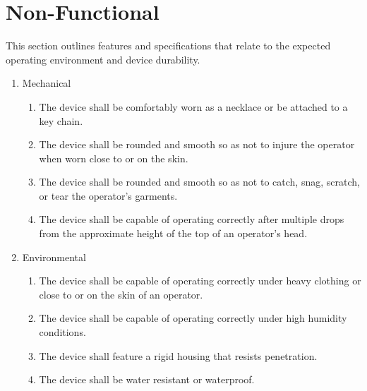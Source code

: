 \documentclass[twoside]{article}
\begin{document}
\section{Non-Functional}
This section outlines features and specifications that relate to the expected operating environment and device durability.
\begin{enumerate}



\item Mechanical
  \begin{enumerate}

    \item The device shall be comfortably worn as a necklace or be attached to a key chain.

    \item The device shall be rounded and smooth so as not to injure the operator when worn close to or on the skin.

    \item The device shall be rounded and smooth so as not to catch, snag, scratch, or tear the operator's garments.

    \item The device shall be capable of operating correctly after multiple drops from the approximate height of the top of an operator's head.

  \end{enumerate}



\item Environmental
  \begin{enumerate}

  \item The device shall be capable of operating correctly under heavy clothing or close to or on the skin of an operator.

  \item The device shall be capable of operating correctly under high humidity conditions.

  \item The device shall feature a rigid housing that resists penetration.

  \item The device shall be water resistant or waterproof.


\end{enumerate}
\end{enumerate}
\end{document}

